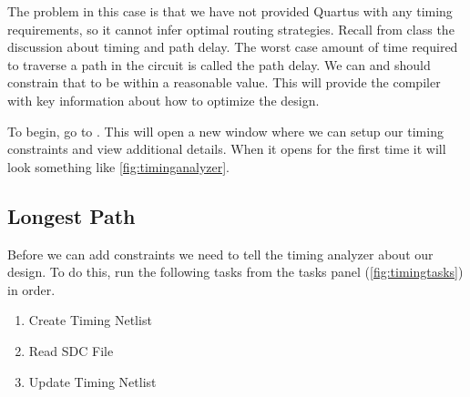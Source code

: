 \documentclass[12pt]{betterjournal}
\begin{document}
The problem in this case is that we have not provided Quartus with any timing requirements, so it cannot infer optimal routing strategies. Recall from class the discussion about timing and path delay. The worst case amount of time required to traverse a path in the circuit is called the path delay. We can and should constrain that to be within a reasonable value. This will provide the compiler with key information about how to optimize the design.

To begin, go to . This will open a new window where we can setup our timing constraints and view additional details. When it opens for the first time it will look something like \autoref{fig:timinganalyzer}.
\subsection{Longest Path}
Before we can add constraints we need to tell the timing analyzer about our design. To do this, run the following tasks from the tasks panel (\autoref{fig:timingtasks}) in order.
\begin{enumerate}
    \item Create Timing Netlist
    \item Read SDC File
    \item Update Timing Netlist
\end{enumerate}
\end{document}
